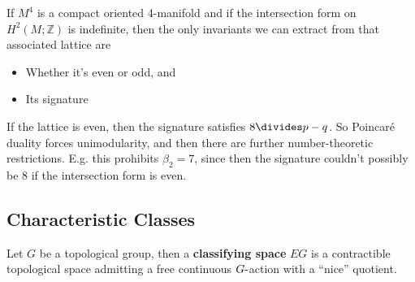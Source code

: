\begin{remark}

If \(M^4\) is a compact oriented 4-manifold and if the intersection form
on \(H^2(M; {\mathbb{Z}})\) is indefinite, then the only invariants we
can extract from that associated lattice are

\begin{itemize}
\tightlist
\item
  Whether it's even or odd, and
\item
  Its signature
\end{itemize}

If the lattice is even, then the signature satisfies \(8\divides p-q\).
So Poincaré duality forces unimodularity, and then there are further
number-theoretic restrictions. E.g. this prohibits \(\beta_2 =7\), since
then the signature couldn't possibly be 8 if the intersection form is
even.

\end{remark}

\hypertarget{characteristic-classes}{%
\subsection{Characteristic Classes}\label{characteristic-classes}}

\begin{definition}[?]

Let \(G\) be a topological group, then a \textbf{classifying space}
\(EG\) is a contractible topological space admitting a free continuous
\(G{\hbox{-}}\)action with a ``nice'' quotient.

\end{definition}

